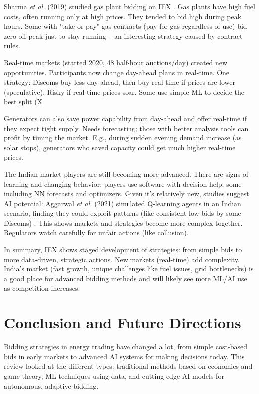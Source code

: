 \documentclass[conference]{IEEEtran}
\begin{document}
Sharma \textit{et al.} (2019) studied gas plant bidding on IEX \cite{Sharma2019}. Gas plants have high fuel costs, often running only at high prices. They tended to bid high during peak hours. Some with "take-or-pay" gas contracts (pay for gas regardless of use) bid zero off-peak just to stay running – an interesting strategy caused by contract rules.

Real-time markets (started 2020, 48 half-hour auctions/day) created new opportunities. Participants now change day-ahead plans in real-time. One strategy: Discoms buy less day-ahead, then buy real-time if prices are lower (speculative). Risky if real-time prices soar. Some use simple ML to decide the best split (X%

Generators can also save power capability from day-ahead and offer real-time if they expect tight supply. Needs forecasting; those with better analysis tools can profit by timing the market. E.g., during sudden evening demand increase (as solar stops), generators who saved capacity could get much higher real-time prices.

The Indian market players are still becoming more advanced. There are signs of learning and changing behavior: players use software with decision help, some including NN forecasts and optimizers. Given it's relatively new, studies suggest AI potential: Aggarwal \textit{et al.} (2021) simulated Q-learning agents in an Indian scenario, finding they could exploit patterns (like consistent low bids by some Discoms) \cite{Aggarwal2021}. This shows markets and strategies become more complex together. Regulators watch carefully for unfair actions (like collusion).

In summary, IEX shows staged development of strategies: from simple bids to more data-driven, strategic actions. New markets (real-time) add complexity. India's market (fast growth, unique challenges like fuel issues, grid bottlenecks) is a good place for advanced bidding methods and will likely see more ML/AI use as competition increases.

\section{Conclusion and Future Directions}

Bidding strategies in energy trading have changed a lot, from simple cost-based bids in early markets to advanced AI systems for making decisions today. This review looked at the different types: traditional methods based on economics and game theory, ML techniques using data, and cutting-edge AI models for autonomous, adaptive bidding.
\end{document}
